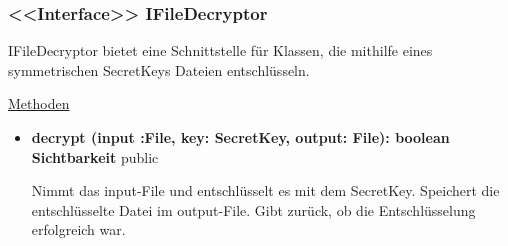 \subsubsection{<<Interface>> IFileDecryptor} \label{service:klasse:IFileDecryptor}
IFileDecryptor bietet eine Schnittstelle für Klassen, die mithilfe eines symmetrischen SecretKeys Dateien entschlüsseln. \newline

\underline{Methoden}
\begin{itemize}
\itemsep0pt
\item \textbf{decrypt (input :File, key: SecretKey, output: File): boolean}\hfill\\
\textbf{Sichtbarkeit} public

Nimmt das input-File und entschlüsselt es mit dem SecretKey. Speichert die entschlüsselte Datei im output-File. Gibt zurück, ob die Entschlüsselung erfolgreich war.

\end{itemize}